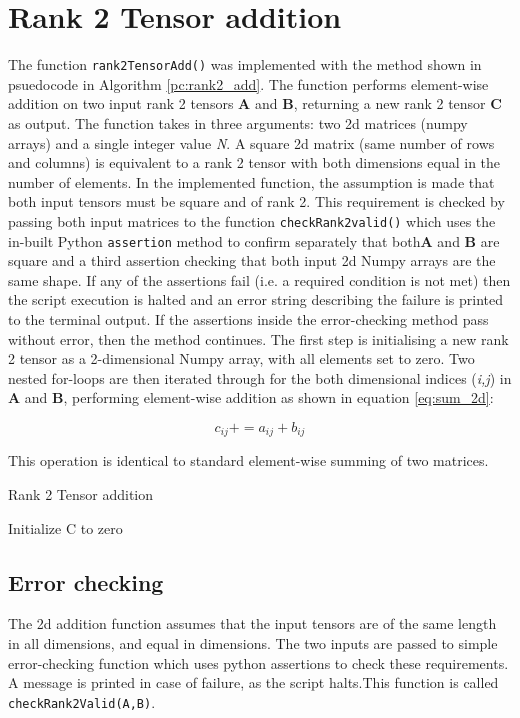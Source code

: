 \documentclass[10 pt, conference]{cssconf}
\begin{document}
\section{Rank 2 Tensor addition}
The function \verb|rank2TensorAdd()| was implemented with the method shown in psuedocode in Algorithm \ref{pc:rank2_add}. The function performs element-wise addition on two input rank 2 tensors $\mathbf{A}$ and $\mathbf{B}$, returning a new rank 2 tensor $\mathbf{C}$ as output. The function takes in three arguments: two 2d matrices (numpy arrays) and a single integer value \textit{N}. A square 2d matrix (same number of rows and columns) is equivalent to a rank 2 tensor with both dimensions equal in the number of elements. In the implemented function, the assumption is made that both input tensors must be square and of rank 2. This requirement is checked by passing both input matrices to the function \verb|checkRank2valid()| which uses the in-built Python \verb|assertion| method to confirm separately that both$\mathbf{A}$ and $\mathbf{B}$ are square and a third assertion checking that both input 2d Numpy arrays are the same shape. If any of the assertions fail (i.e. a required condition is not met) then the script execution is halted and an error string describing the failure is printed to the terminal output.
If the assertions inside the error-checking method pass without error, then the method continues. The first step is initialising a new rank 2 tensor as a 2-dimensional Numpy array, with all elements set to zero. Two nested for-loops are then iterated through for the both dimensional indices (\textit{i,j}) in $\mathbf{A}$ and $\mathbf{B}$, performing element-wise addition as shown in equation \ref{eq:sum_2d}:

\begin{equation}\label{eq:sum_2d}
    c_{ij} \mathrel{{+}{=}}
     a_{ij} + b_{ij}
\end{equation}

This operation is identical to standard element-wise summing of two matrices.

\begin{algorithm}[ht]
\caption{Rank 2 Tensor addition}\label{pc:rank2_add}
    	\SetAlgoLined
	Initialize C to zero\;
\end{algorithm}

\subsection{Error checking}
The 2d addition function  assumes that the input tensors are of the same length in all dimensions, and equal in dimensions. The two inputs are passed to simple error-checking function which uses python assertions to check these requirements. A message is printed in case of failure, as the script halts.This function is called \verb|checkRank2Valid(A,B)|.
\end{document}
